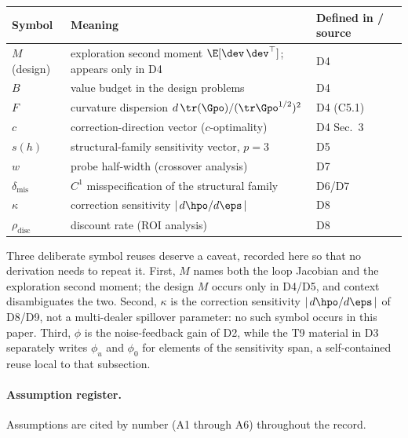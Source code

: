 \begin{center}\small
\begin{tabular}{@{}l>{\raggedright\arraybackslash}p{4.9cm}l@{}}
\hline
Symbol & Meaning & Defined in / source\\
\hline
$M$ (design) & exploration second moment $\E[\dev\,\dev^\top]$;
  appears only in D4 & D4\\
$B$ & value budget in the design problems & D4\\
$F$ & curvature dispersion
  $d\,\tr(\Gpo)/(\tr \Gpo^{1/2})^2$ & D4 (C5.1)\\
$c$ & correction-direction vector ($c$-optimality) & D4 Sec.~3\\
$s(h)$ & structural-family sensitivity vector, $p = 3$ & D5\\
$w$ & probe half-width (crossover analysis) & D7\\
$\delta_{\mathrm{mis}}$ & $C^1$ misspecification of the
  structural family & D6/D7\\
$\kappa$ & correction sensitivity
  $\lvert\, d\hpo/d\eps \,\rvert$ & D8\\
$\rho_{\mathrm{disc}}$ & discount rate (ROI analysis) & D8\\
\hline
\end{tabular}
\end{center}

Three deliberate symbol reuses deserve a caveat, recorded here so that no
derivation needs to repeat it. First, $M$ names both the loop Jacobian and
the exploration second moment; the design $M$ occurs only in D4/D5, and
context disambiguates the two. Second, $\kappa$ is the correction
sensitivity $\lvert\, d\hpo/d\eps \,\rvert$ of D8/D9, not a multi-dealer
spillover parameter: no such symbol occurs in this paper. Third, $\phi$ is
the noise-feedback gain of D2, while the T9 material in D3 separately
writes $\phi_u$ and $\phi_0$ for elements of the sensitivity span, a
self-contained reuse local to that subsection.

\paragraph{Assumption register.}
Assumptions are cited by number (A1 through A6) throughout the record.

